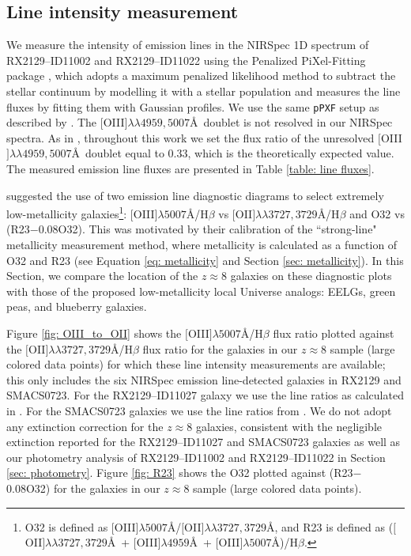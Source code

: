 \documentclass[twocolumn]{aastex631}
\begin{document}
\subsection{Line intensity measurement}

We measure the intensity of emission lines in the NIRSpec 1D spectrum of RX2129--ID11002 and RX2129--ID11022 using the Penalized PiXel-Fitting package \citep[\texttt{pPXF;}][]{2004PASP..116..138C, 2017MNRAS.466..798C, 2022arXiv220814974C}, which adopts a maximum penalized likelihood method \citep{1997AJ....114..228M} to subtract the stellar continuum by modelling it with a stellar population and measures the line fluxes by fitting them with Gaussian profiles. We use the same \texttt{pPXF} setup as described by \cite{williams+2022}. The $[$O{\footnotesize\;III}$]\lambda \lambda 4959, 5007$\AA\ doublet is not resolved in our NIRSpec spectra. As in \cite{williams+2022}, throughout this work we set the flux ratio of the unresolved $[$O{\footnotesize\;III}$]\lambda \lambda 4959, 5007$\AA\ doublet equal to 0.33, which is the theoretically expected value. The measured emission line fluxes are presented in Table \ref{table: line fluxes}.

\cite{izotov+2019} suggested the use of two emission line diagnostic diagrams to select extremely low-metallicity galaxies\footnote{O32 is defined as $[$O{\footnotesize\;III}$]\lambda 5007$\AA/$[$O{\footnotesize\;II}$]\lambda \lambda 3727, 3729$\AA, and R23 is defined as ($[$O{\footnotesize\;II}$]\lambda \lambda 3727,3729$\AA\ + $[$O{\footnotesize\;III}$]\lambda 4959$\AA\ + $[$O{\footnotesize\;III}$]\lambda 5007$\AA)/H$\beta$.}: $[$O{\footnotesize\;III}$]\lambda 5007$\AA/H$\beta$ vs $[$O{\footnotesize\;II}$]\lambda \lambda 3727, 3729$\AA/H$\beta$ and O32 vs (R23$-$0.08O32). This was motivated by their calibration of the ``strong-line" metallicity measurement method, where metallicity is calculated as a function of O32 and R23 (see Equation \ref{eq: metallicity} and Section \ref{sec: metallicity}). In this Section, we compare the location of the $z \approx 8$ galaxies on these diagnostic plots with those of the proposed low-metallicity local Universe analogs: EELGs, green peas, and blueberry galaxies. 

Figure \ref{fig: OIII_to_OII} shows the $[$O{\footnotesize\;III}$]\lambda 5007$\AA/H$\beta$ flux ratio plotted against the $[$O{\footnotesize\;II}$]\lambda \lambda 3727, 3729$\AA/H$\beta$ flux ratio for the galaxies in our $z \approx 8$ sample (large colored data points) for which these line intensity measurements are available; this only includes the six NIRSpec emission line-detected galaxies in RX2129 and SMACS0723. For the RX2129--ID11027 galaxy we use the line ratios as calculated in \cite{williams+2022}. For the SMACS0723 galaxies we use the line ratios from \citet{curti+2022}. We do not adopt any extinction correction for the $z \approx 8$ galaxies, consistent with the negligible extinction reported for the RX2129--ID11027 and SMACS0723 galaxies \citep[see][respectively]{williams+2022, curti+2022} as well as our photometry analysis of RX2129--ID11002 and RX2129--ID11022 in Section \ref{sec: photometry}. Figure \ref{fig: R23} shows the O32 plotted against (R23$-$0.08O32) for the galaxies in our $z \approx 8$ sample (large colored data points). 
\end{document}
